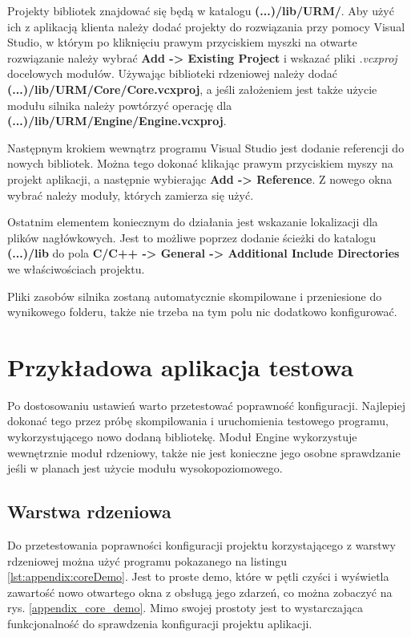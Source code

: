 Projekty bibliotek znajdować się będą w katalogu \textbf{(...)/lib/URM/}. Aby użyć ich z aplikacją klienta należy dodać projekty do rozwiązania przy pomocy Visual Studio, w którym po kliknięciu prawym przyciskiem myszki na otwarte rozwiązanie należy wybrać \textbf{Add -> Existing Project} i wskazać pliki \textit{.vcxproj} docelowych modułów. Używając biblioteki rdzeniowej należy dodać \textbf{(...)/lib/URM/Core/Core.vcxproj}, a jeśli założeniem jest także użycie modułu silnika należy powtórzyć operację dla \textbf{(...)/lib/URM/Engine/Engine.vcxproj}.

Następnym krokiem wewnątrz programu Visual Studio jest dodanie referencji do nowych bibliotek. Można tego dokonać klikając prawym przyciskiem myszy na projekt aplikacji, a następnie wybierając \textbf{Add -> Reference}. Z nowego okna wybrać należy moduły, których zamierza się użyć.

Ostatnim elementem koniecznym do działania jest wskazanie lokalizacji dla plików nagłówkowych. Jest to możliwe poprzez dodanie ścieżki do katalogu \textbf{(...)/lib} do pola \textbf{C/C++ -> General -> Additional Include Directories} we właściwościach projektu.

Pliki zasobów silnika zostaną automatycznie skompilowane i przeniesione do wynikowego folderu, także nie trzeba na tym polu nic dodatkowo konfigurować. 

\section*{Przykładowa aplikacja testowa}
Po dostosowaniu ustawień warto przetestować poprawność konfiguracji. Najlepiej dokonać tego przez próbę skompilowania i uruchomienia testowego programu, wykorzystującego nowo dodaną bibliotekę. Moduł Engine wykorzystuje wewnętrznie moduł rdzeniowy, także nie jest konieczne jego osobne sprawdzanie jeśli w planach jest użycie modułu wysokopoziomowego. 

\subsection*{Warstwa rdzeniowa}
Do przetestowania poprawności konfiguracji projektu korzystającego z warstwy rdzeniowej można użyć programu pokazanego na listingu \ref{lst:appendix:coreDemo}. Jest to proste demo, które w pętli czyści i wyświetla zawartość nowo otwartego okna z obsługą jego zdarzeń, co można zobaczyć na rys. \ref{appendix_core_demo}. Mimo swojej prostoty jest to wystarczająca funkcjonalność do sprawdzenia konfiguracji projektu aplikacji. 

